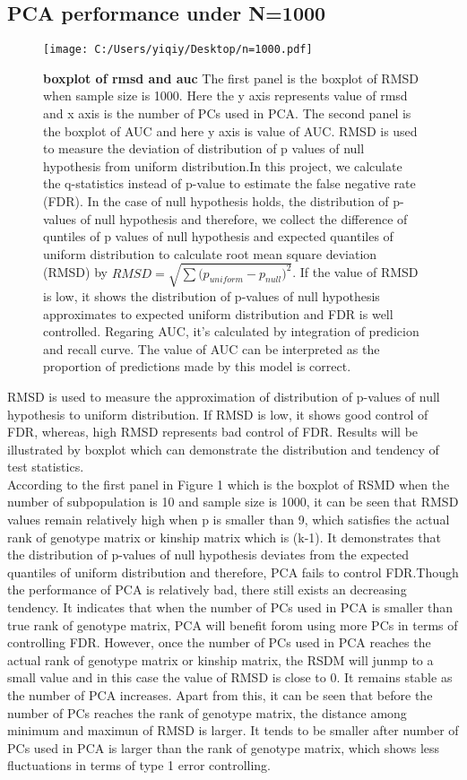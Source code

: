 \documentclass[12pt]{article}
\begin{document}
\subsection{PCA performance under N=1000}
\begin{figure}[bp!]
  \centering
  \texttt{[image: C:/Users/yiqiy/Desktop/n=1000.pdf]}
  \caption{
    {\bf boxplot of rmsd and auc}
    The first panel is the boxplot of RMSD when sample size is 1000. Here the y axis represents value of rmsd and x axis is the number of PCs used in PCA.
    The second panel is the boxplot of AUC and here y axis is value of AUC. RMSD is used to measure the deviation of distribution of p values of null hypothesis from uniform distribution.In this project, we calculate the q-statistics instead of p-value to estimate the false negative rate (FDR). In the case of null hypothesis holds, the distribution of p-values of null hypothesis and therefore, we collect the difference of quntiles of p values of null hypothesis and expected quantiles of uniform distribution to calculate root mean square deviation (RMSD) by $RMSD=\sqrt{\sum{(p_{uniform}-p_{null}})^2}$. If the value of RMSD is low, it shows the distribution of p-values of null hypothesis approximates to expected uniform distribution and FDR is well controlled. Regaring AUC, it's calculated by integration of predicion and recall curve. The value of AUC can be interpreted as the proportion of predictions made by this model is correct. }
  \label{fig:example}
\end{figure}
RMSD is used to measure the approximation of distribution of p-values of null hypothesis to uniform distribution. If RMSD is low, it shows good control of FDR, whereas, high RMSD represents bad control of FDR. Results will be illustrated by boxplot which can demonstrate the distribution and tendency of test statistics. \\
According to the first panel in Figure 1 which is the boxplot of RSMD when the number of subpopulation is 10 and sample size is 1000, it can be seen that RMSD values remain relatively high when p is smaller than 9, which satisfies the actual rank of genotype matrix or kinship matrix which is (k-1). It demonstrates that the distribution of p-values of null hypothesis deviates from the expected quantiles of uniform distribution and therefore, PCA fails to control FDR.Though the performance of PCA is relatively bad, there still exists an decreasing tendency. It indicates that when the number of PCs used in PCA is smaller than true rank of genotype matrix, PCA will benefit forom using more PCs in terms of controlling FDR. However, once the number of PCs used in PCA reaches the actual rank of genotype matrix or kinship matrix, the RSDM will junmp to a small value and in this case the value of RMSD is close to 0. It remains stable as the number of PCA increases. Apart from this, it can be seen that before the number of PCs reaches the rank of genotype matrix, the distance among minimum and maximun of RMSD is larger. It tends to be smaller after number of PCs used in PCA is larger than the rank of genotype matrix, which shows less fluctuations in terms of type 1 error controlling.\\
\end{document}
